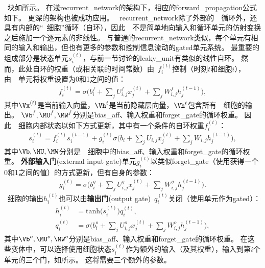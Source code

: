 ~块如所示。
在浅\gls{recurrent_network}的架构下，相应的\gls{forward_propagation}公式如下。
更深的架构也被成功应用\citep{Graves-et-al-2013,Pascanu-et-al-2014a}。
~\gls{recurrent_network}除了外部的~~循环外，还具有内部的``~细胞''循环（自环），因此~~不是简单地向输入和循环单元的仿射变换之后施加一个逐元素的非线性。
与普通的\gls{recurrent_network}类似，每个单元有相同的输入和输出，但也有更多的参数和控制信息流动的\gls{gated}单元系统。
最重要的组成部分是状态单元$s_i^{(t)}$，与前一节讨论的\gls{leaky_unit}有类似的线性自环。
然而，此处自环的权重（或相关联的时间常数）由~$f_i^{(t)}$控制（时刻$t$和细胞$i$），由~~单元将权重设置为0和1之间的值：
\begin{align}
 f_i^{(t)} = \sigma \Big( b_i^f + \sum_j U_{i,j}^f x_j^{(t)} + \sum_j W_{i,j}^f h_j^{(t-1)} \Big),
\end{align}
其中$\Vx^{(t)}$是当前输入向量，$\Vh^{t}$是当前隐藏层向量，$\Vh^{t}$包含所有~~细胞的输出。 
$\Vb^f, \MU^f, \MW^f$分别是\gls{bias_aff}、输入权重和\gls{forget_gate}的循环权重。
因此~~细胞内部状态以如下方式更新，其中有一个条件的自环权重$f_i^{(t)}$：
\begin{align}
 s_i^{(t)} = f_i^{(t)}  s_i^{(t-1)} +  g_i^{(t)}
 \sigma \Big( b_i + \sum_j U_{i,j} x_j^{(t)} + \sum_j W_{i,j} h_j^{(t-1)} \Big),
\end{align}
其中$\Vb, \MU, \MW$分别是~~细胞中的\gls{bias_aff}、输入权重和\gls{forget_gate}的循环权重。
\textbf{外部输入门}(external input gate)单元$g_i^{(t)}$以类似\gls{forget_gate}（使用获得一个0和1之间的值）的方式更新，但有自身的参数：
\begin{align}
 g_i^{(t)} = \sigma \Big( b_i^g + \sum_j U_{i,j}^g x_j^{(t)} + \sum_j W_{i,j}^g h_j^{(t-1)} \Big).
\end{align}
~细胞的输出$h_i^{(t)}$也可以由\textbf{输出门}(output gate)~$q_i^{(t)}$关闭（使用单元作为\gls{gated}）：
\begin{align}
 h_i^{(t)} &= \text{tanh}\big( s_i^{(t)} \big) q_i^{(t)}, \\
 q_i^{(t)} &= \sigma \Big( b_i^o + \sum_j U_{i,j}^o x_j^{(t)} + \sum_j W_{i,j}^o h_j^{(t-1)} \Big),
\end{align}
其中$\Vb^o, \MU^o, \MW^o$分别是\gls{bias_aff}、输入权重和\gls{forget_gate}的循环权重。
在这些变体中，可以选择使用细胞状态$s_i^{(t)}$作为额外的输入（及其权重），输入到第$i$个单元的三个门，如所示。
这将需要三个额外的参数。


